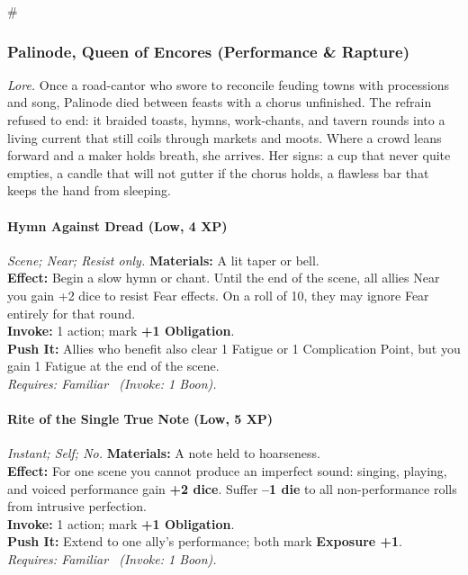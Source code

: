 # %

\subsubsection{Palinode, Queen of Encores (Performance \& Rapture)}
\textit{Lore.} Once a road-cantor who swore to reconcile feuding towns with processions and song, Palinode died between feasts with a chorus unfinished. The refrain refused to end: it braided toasts, hymns, work-chants, and tavern rounds into a living current that still coils through markets and moots. Where a crowd leans forward and a maker holds breath, she arrives. Her signs: a cup that never quite empties, a candle that will not gutter if the chorus holds, a flawless bar that keeps the hand from sleeping.

\paragraph*{Hymn Against Dread (Low, 4 XP)} \emph{Scene; Near; Resist only.}
\textbf{Materials:} A lit taper or bell.\\
\textbf{Effect:} Begin a slow hymn or chant. Until the end of the scene, all allies Near you gain +2 dice to resist Fear effects. On a roll of 10, they may ignore Fear entirely for that round.\\
\textbf{Invoke:} 1 action; mark \textbf{+1 Obligation}.\\
\textbf{Push It:} Allies who benefit also clear 1 Fatigue or 1 Complication Point, but you gain 1 Fatigue at the end of the scene.\\
\emph{Requires: Familiar \ (\textit{Invoke:} 1 Boon).}

\paragraph*{Rite of the Single True Note (Low, 5 XP)} \emph{Instant; Self; No.}
\textbf{Materials:} A note held to hoarseness.\\
\textbf{Effect:} For one scene you cannot produce an imperfect sound: singing, playing, and voiced performance gain \textbf{+2 dice}. Suffer \textbf{--1 die} to all non-performance rolls from intrusive perfection.\\
\textbf{Invoke:} 1 action; mark \textbf{+1 Obligation}.\\
\textbf{Push It:} Extend to one ally's performance; both mark \textbf{Exposure +1}.\\
\emph{Requires: Familiar \ (\textit{Invoke:} 1 Boon).}

